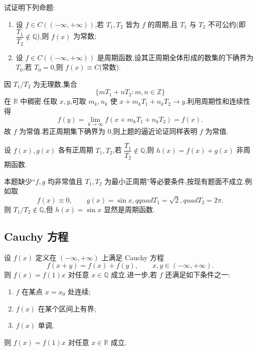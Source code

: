 \begin{example}
    试证明下列命题:
    \begin{enumerate}
        \item 设 $f\in C(( -\infty,+\infty))$,若 $T_1,T_2$ 皆为 $f$ 的周期,且 $T_1$ 与 $T_2$ 不可公约(即 $\dfrac{T_1}{T_2}\notin\mathbb{Q}$),则 $f(x)$ 为常数;
        \item 设 $f\in C(( -\infty,+\infty))$ 是周期函数,设其正周期全体形成的数集的下确界为 $T_0$,若 $T_0=0$,则 $f(x)\equiv C$(常数).
    \end{enumerate}
\end{example}
\exampleblank

\begin{solution}
    因 $T_1/T_2$ 为无理数,集合
    \[
        \{mT_1+nT_2:m,n\in\mathbb Z\}
    \]
    在 $\mathbb R$ 中稠密.任取 $x,y$,可取 $m_k,n_k$ 使 $x+m_kT_1+n_kT_2\to y$.利用周期性和连续性得
    \[
        f(y)=\lim\limits_{k\to\infty}f(x+m_kT_1+n_kT_2)=f(x).
    \]
    故 $f$ 为常值.若正周期集下确界为 $0$,则上题的逼近论证同样表明 $f$ 为常值.
\end{solution}

\begin{example}
    设 $f(x),g(x)$ 各有正周期 $T_1,T_2$,若 $\dfrac{T_1}{T_2}\notin\mathbb{Q}$,则 $h(x)=f(x)+g(x)$ 非周期函数.
\end{example}
\exampleblank

\begin{solution}
    本题缺少“$f,g$ 均非常值且 $T_1,T_2$ 为最小正周期”等必要条件,按现有题面不成立.例如取
    \[
        f(x)\equiv0,\qquad g(x)=\sin x,qquad T_1=\sqrt2,quad T_2=2\pi.
    \]
    则 $T_1/T_2\notin\mathbb Q$,但 $h(x)=\sin x$ 显然是周期函数.
\end{solution}



\subsection{Cauchy 方程}

\begin{proposition}[\markstar]
    设 $f(x)$ 定义在 $(-\infty,+\infty)$ 上满足 Cauchy 方程
    \[
        f(x+y)=f(x)+f(y),
        \qquad x,y\in(-\infty,+\infty).
    \]
    则 $f(x)=f(1)x$ 对任意 $x\in\mathbb{Q}$ 成立.进一步,若 $f$ 还满足如下条件之一:
    \begin{enumerate}
        \item $f$ 在某点 $x=x_0$ 处连续;
        \item $f(x)$ 在某个区间上有界;
        \item $f(x)$ 单调,
    \end{enumerate}
    则 $f(x)=f(1)x$ 对任意 $x\in\mathbb{R}$ 成立.
\end{proposition}

